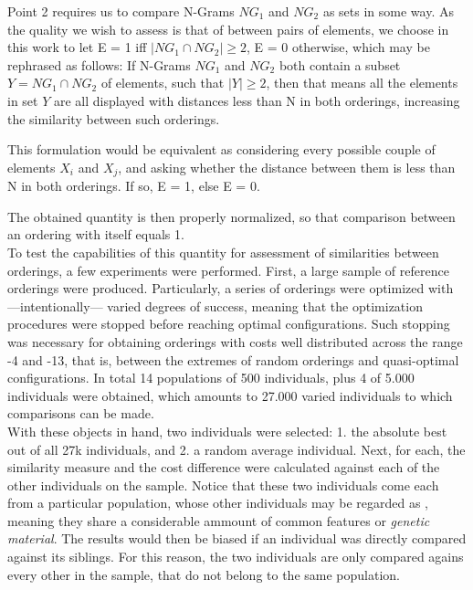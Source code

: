 \documentclass[article]{article}
\begin{document}
Point 2 requires us to compare N-Grams $NG_1$ and $NG_2$ as sets in some way. As the quality we wish to assess is that of  between pairs of elements, we choose in this work to let E = 1 iff $| {NG_1} \cap {NG_2} | \geq 2$, E = 0 otherwise, which may be rephrased as follows: If N-Grams $NG_1$ and $NG_2$ both contain a subset $Y = {NG_1} \cap {NG_2}$ of elements, such that $|Y| \geq 2$, then that means all the elements in set $Y$ are all displayed with distances less than N in both orderings, increasing the similarity between such orderings. 

This formulation would be equivalent as considering every possible couple of elements $X_i$ and $X_j$, and asking whether the distance between them is less than N in both orderings. If so, E = 1, else E = 0. 

The obtained quantity is then properly normalized, so that comparison between an ordering with itself equals 1.\\

To test the capabilities of this quantity for assessment of similarities between orderings, a few experiments were performed. First, a large sample of reference orderings were produced. Particularly, a series of orderings were optimized with ---intentionally--- varied degrees of success, meaning that the optimization procedures were stopped before reaching optimal configurations. Such stopping was necessary for obtaining orderings with costs well distributed across the range -4 and -13, that is, between the extremes of random orderings and quasi-optimal configurations. In total 14 populations of 500 individuals, plus 4 of 5.000 individuals were obtained, which amounts to 27.000 varied individuals to which comparisons can be made. \\

With these objects in hand, two individuals were selected: 1. the absolute best out of all 27k individuals, and 2. a random average individual. Next, for each, the similarity measure and the cost difference were calculated against each of the other individuals on the sample. Notice that these two individuals come each from a particular population, whose other individuals may be regarded as , meaning they share a considerable ammount of common features or \textit{genetic material}. The results would then be biased if an individual was directly compared against its siblings. For this reason, the two individuals are only compared agains every other in the sample, that do not belong to the same population.
\end{document}
